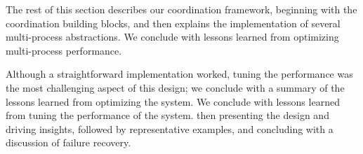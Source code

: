 The rest of this section describes our coordination framework, 
beginning with the coordination building blocks,
and then explains the implementation of several multi-process abstractions.
We conclude with lessons learned from optimizing  multi-process performance.

Although a straightforward implementation worked, tuning the performance was the most challenging
aspect of this design;  we conclude with a summary of the lessons learned from optimizing the system.
We conclude with lessons learned from tuning the performance of the system.
then presenting the design and driving insights,
followed by representative examples, 
and concluding with a discussion of failure recovery.


